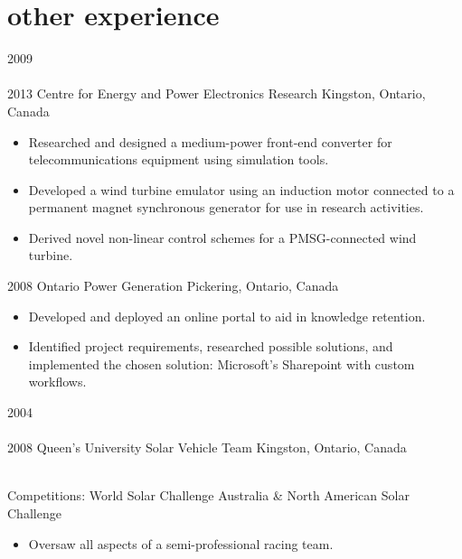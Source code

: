 
\section{other experience}
\begin{entrylist}
\entry
  {2009\\\faChevronDown\\2013}
  {Centre for Energy and Power Electronics Research}
  {Kingston, Ontario, Canada}
  {
  \begin{itemize}[leftmargin=12pt]
    \item Researched and designed a medium-power front-end converter for telecommunications equipment using simulation tools.
    \item Developed a wind turbine emulator using an induction motor connected to a permanent magnet synchronous generator for use in research activities.
    \item Derived novel non-linear control schemes for a PMSG-connected wind turbine.
  \end{itemize}}
\entry
  {2008}
  {Ontario Power Generation}
  {Pickering, Ontario, Canada}
  {
  \begin{itemize}[leftmargin=12pt]
    \item Developed and deployed an online portal to aid in knowledge retention.
    \item Identified project requirements, researched possible solutions, and implemented the chosen solution: Microsoft's Sharepoint with custom workflows.
  \end{itemize}
}
\entry
  {2004\\\faChevronDown\\2008}
  {Queen's University Solar Vehicle Team}
  {Kingston, Ontario, Canada}
  {\\
  Competitions: {\bodyfontit World Solar Challenge Australia} \&
  {\bodyfontit North American Solar Challenge}
  \begin{itemize}[leftmargin=12pt]
    \item Oversaw all aspects of a semi-professional racing team.

\end{itemize}}
\end{entrylist}

